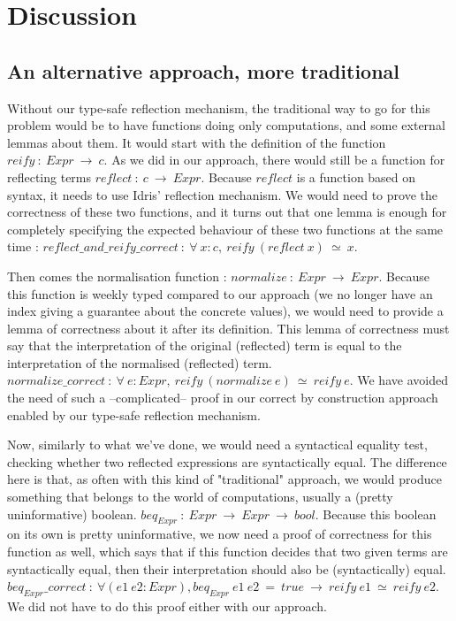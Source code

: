 \section {Discussion}


	\subsection{An alternative approach, more traditional}

Without our type-safe reflection mechanism, the traditional way to go for this problem would be to have functions doing only computations, and some external lemmas about them. It would start with the definition of the function $reify\ :\ Expr\ \rightarrow\ c$. As we did in our approach, there would still be a function for reflecting terms $reflect\ :\ c\ \rightarrow\ Expr$. Because $reflect$ is a function based on syntax, it needs to use Idris' reflection mechanism. We would need to prove the correctness of these two functions, and it turns out that one lemma is enough for completely specifying the expected behaviour of these two functions at the same time : $reflect\_and\_reify\_correct\ :\ \forall\ x:c,\ reify\ (reflect\ x)\  \simeq \ x$.

Then comes the normalisation function : $normalize\ :\ Expr\ \rightarrow\ Expr$. Because this function is weekly typed compared to our approach (we no longer have an index giving a guarantee about the concrete values), we would need to provide a lemma of correctness about it after its definition. This lemma of correctness must say that the interpretation of the original (reflected) term is equal to the interpretation of the normalised (reflected) term. $normalize\_correct\ :\ \forall\ e:Expr,\ reify\ (normalize\ e)\  \simeq\ reify\ e$. We have avoided the need of such a --complicated-- proof in our correct by construction approach enabled by our type-safe reflection mechanism.

Now, similarly to what we've done, we would need a syntactical equality test, checking whether two reflected expressions are syntactically equal. The difference here is that, as often with this kind of "traditional" approach, we would produce something that belongs to the world of computations, usually a (pretty uninformative) boolean.
$beq_{Expr}\ :\ Expr\ \rightarrow\ Expr\ \rightarrow\ bool$. Because this boolean on its own is pretty uninformative, we now need a proof of correctness for this function as well, which says that if this function decides that two given terms are syntactically equal, then their interpretation should also be (syntactically) equal. $beq_{Expr}\_correct\ :\ \forall (e1\ e2:Expr), beq_{Expr}\ e1\ e2\ =\ true\ \rightarrow\ reify\ e1\  \simeq\ reify\ e2$. We did not have to do this proof either with our approach.

